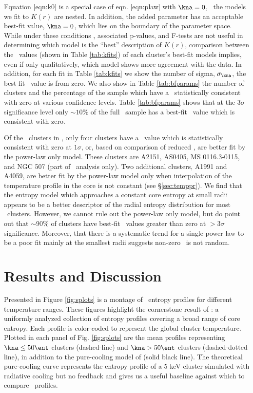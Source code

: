 \documentclass{emulateapj}
\begin{document}
Equation \ref{eqn:k0} is a special case of eqn. \ref{eqn:plaw} with
$\kna = 0$, \eg\ the models we fit to $K(r)$ are nested. In addition,
the added parameter has an acceptable best-fit value, $\kna = 0$,
which lies on the boundary of the parameter space. While under these
conditions \chisq, associated p-values, and F-tests are not useful in
determining which model is the ``best'' description of $K(r)$,
comparison between the \chisq\ values (shown in Table \ref{tab:kfits})
of each cluster's best-fit models implies, even if only qualitatively,
which model shows more agreement with the data. In addition, for each
fit in Table \ref{tab:kfits} we show the number of sigma,
$\sigma_{\kna}$, the best-fit \kna\ value is from zero. We also show
in Table \ref{tab:bfparams} the number of clusters and the percentage
of the sample which have a \kna\ statistically consistent with zero at
various confidence levels. Table \ref{tab:bfparams} shows that at the
$3\sigma$ significance level only $\sim10\%$ of the full
\accept\ sample has a best-fit \kna\ value which is consistent with
zero.

Of the \numcluster\ clusters in \accept, only four clusters have a
\kna\ value which is statistically consistent with zero at $1\sigma$,
or, based on comparison of reduced \chisq, are better fit by the
power-law only model. These clusters are A2151, AS0405, MS
0116.3-0115, and NGC 507 (part of \hifl\ analysis only). Two
additional clusters, A1991 and A4059, are better fit by the power-law
model only when interpolation of the temperature profile in the core
is not constant (see \S\ref{sec:temppr}). We find that the entropy
model which approaches a constant core entropy at small radii appears
to be a better descriptor of the radial entropy distribution for most
\accept\ clusters. However, we cannot rule out the power-law only
model, but do point out that $\sim90\%$ of clusters have best-fit
\kna\ values greater than zero at $> 3\sigma$ significance. Moreover,
that there is a systematic trend for a single power-law to be a poor
fit mainly at the smallest radii suggests non-zero \kna\ is not
random.

\section{Results and Discussion}
\label{sec:r&d}

Presented in Figure \ref{fig:splots} is a montage of \accept\ entropy
profiles for different temperature ranges. These figures highlight the
cornerstone result of \accept: a uniformly analyzed collection of
entropy profiles covering a broad range of core entropy. Each profile
is color-coded to represent the global cluster temperature. Plotted in
each panel of Fig. \ref{fig:splots} are the mean profiles representing
$\kna \le 50 \ent$ clusters (dashed-line) and $\kna > 50 \ent$
clusters (dashed-dotted line), in addition to the pure-cooling model
of \citet{voitbryan} (solid black line). The theoretical pure-cooling
curve represents the entropy profile of a 5 keV cluster simulated with
radiative cooling but no feedback and gives us a useful baseline
against which to compare \accept\ profiles.
\end{document}
